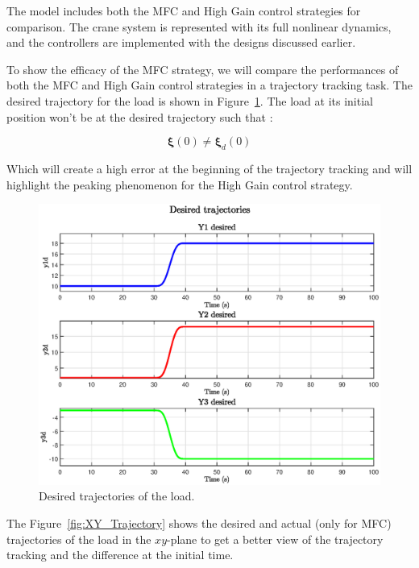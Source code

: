 The model includes both the MFC and High Gain control strategies for comparison. The crane system is 
represented with its full nonlinear dynamics, and the controllers are implemented with the designs 
discussed earlier.

To show the efficacy of the MFC strategy, we will compare the performances of both the MFC and High Gain control 
strategies in a trajectory tracking task. The desired trajectory for the load is shown 
in Figure~\ref{fig:Desired_Trajectory}. The load at its initial position won't be at the desired trajectory
such that : 

\begin{equation}
    \boldsymbol{\xi}(0) \neq \boldsymbol{\xi}_d(0)
\end{equation}

Which will create a high error at the beginning of the trajectory tracking and will highlight the 
peaking phenomenon for the High Gain control strategy.

\begin{figure}[htbp]
    \centering
    \includegraphics[width=0.75\linewidth]{imgs/section1/desiredTraj.eps}
    \caption{Desired trajectories of the load.}
    \label{fig:Desired_Trajectory}
\end{figure}

The Figure~\ref{fig:XY_Trajectory} shows the desired and actual (only for MFC) trajectories of the load in 
the \(xy\)-plane to get a better view of the trajectory tracking and the difference at the initial time.

